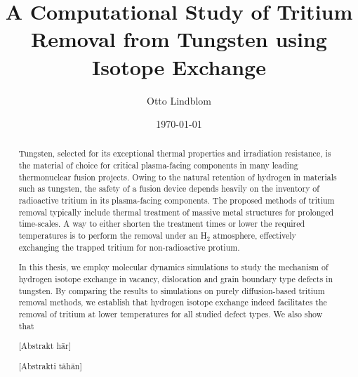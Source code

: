 \documentclass[english,twoside,openright]{HYgradu}
\title{A Computational Study of Tritium Removal from Tungsten using Isotope Exchange}
\author{Otto Lindblom}
\date{\today}
\begin{document}
\maketitle

\begin{abstract}
Tungsten, selected for its exceptional thermal properties and irradiation resistance, is the material of choice for critical plasma-facing components in many leading thermonuclear fusion projects.
Owing to the natural retention of hydrogen in materials such as tungsten, the safety of a fusion device depends heavily on the inventory of radioactive tritium in its plasma-facing components. 
The proposed methods of tritium removal typically include thermal treatment of massive metal structures for prolonged time-scales.
A way to either shorten the treatment times or lower the required temperatures is to perform the removal under an H$_2$ atmosphere, effectively exchanging the trapped tritium for non-radioactive protium. 

In this thesis, we employ molecular dynamics simulations to study the mechanism of hydrogen isotope exchange in vacancy, dislocation and grain boundary type defects in tungsten.
By comparing the results to simulations on purely diffusion-based tritium removal methods, we establish that hydrogen isotope exchange indeed facilitates the removal of tritium at lower temperatures for all studied defect types.  
We also show that
\end{abstract}

\begin{abstract}
[Abstrakt här]
\end{abstract}

\begin{abstract}
[Abstrakti tähän]
\end{abstract}

\mytableofcontents

\mynomenclature


\end{document}

